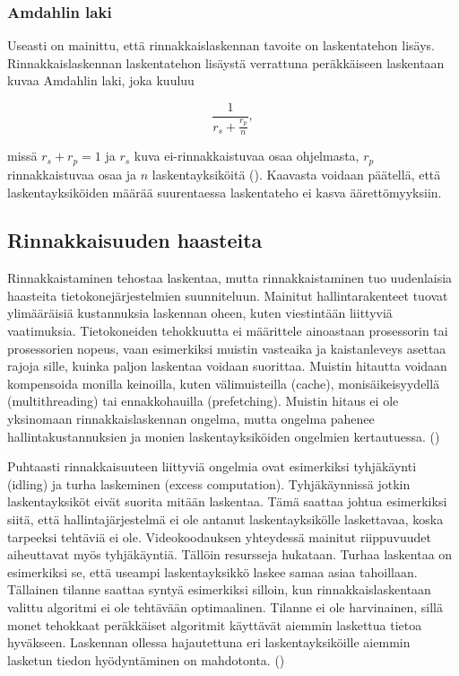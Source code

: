 \subsubsection{Amdahlin laki}

Useasti on mainittu, että rinnakkaislaskennan tavoite on laskentatehon
lisäys. Rinnakkaislaskennan laskentatehon lisäystä verrattuna peräkkäiseen
laskentaan kuvaa Amdahlin laki, joka kuuluu

\begin{center}
\begin{equation}\frac{1}{r_s + \frac{r_p}{n}},\end{equation}
\end{center}

missä $r_s + r_p = 1$ ja $r_s$ kuva ei-rinnakkaistuvaa osaa ohjelmasta,
$r_p$ rinnakkaistuvaa osaa ja $n$ laskentayksiköitä (\citealt{amdahl}).
Kaavasta voidaan päätellä, että laskentayksiköiden määrää suurentaessa
laskentateho ei kasva äärettömyyksiin.

\subsection{Rinnakkaisuuden haasteita}

Rinnakkaistaminen tehostaa laskentaa, mutta rinnakkaistaminen tuo
uudenlaisia haasteita tietokonejärjestelmien suunniteluun. Mainitut
hallintarakenteet tuovat ylimääräisiä kustannuksia laskennan oheen,
kuten viestintään liittyviä vaatimuksia.
Tietokoneiden tehokkuutta ei määrittele ainoastaan prosessorin tai
prosessorien nopeus, vaan esimerkiksi muistin vasteaika ja kaistanleveys
asettaa rajoja sille, kuinka paljon laskentaa voidaan suorittaa. Muistin
hitautta voidaan kompensoida monilla keinoilla, kuten välimuisteilla (cache),
monisäikeisyydellä (multithreading) tai ennakkohauilla (prefetching). Muistin
hitaus ei ole yksinomaan rinnakkaislaskennan ongelma, mutta ongelma pahenee
hallintakustannuksien ja monien laskentayksiköiden ongelmien kertautuessa.
(\citealt{intro})

Puhtaasti rinnakkaisuuteen liittyviä ongelmia ovat esimerkiksi tyhjäkäynti
(idling) ja turha laskeminen (excess computation). Tyhjäkäynnissä jotkin
laskentayksiköt eivät suorita mitään laskentaa. Tämä saattaa johtua esimerkiksi
siitä, että hallintajärjestelmä ei ole antanut laskentayksikölle laskettavaa,
koska tarpeeksi tehtäviä ei ole. Videokoodauksen yhteydessä mainitut
riippuvuudet aiheuttavat myös tyhjäkäyntiä. Tällöin resursseja hukataan. Turhaa
laskentaa on esimerkiksi se, että useampi laskentayksikkö laskee samaa asiaa
tahoillaan. Tällainen tilanne saattaa syntyä esimerkiksi silloin, kun
rinnakkaislaskentaan valittu algoritmi ei ole tehtävään optimaalinen. Tilanne
ei ole harvinainen, sillä monet tehokkaat peräkkäiset algoritmit käyttävät
aiemmin laskettua tietoa hyväkseen. Laskennan ollessa hajautettuna eri
laskentayksiköille aiemmin lasketun tiedon hyödyntäminen on mahdotonta.
(\citealt{intro})

